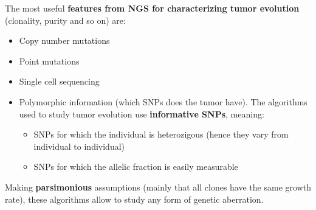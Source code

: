   The most useful \textbf{features from NGS for characterizing tumor evolution}
  (clonality, purity and so on) are:
  \begin{itemize}
    \item Copy number mutations
    \item Point mutations
    \item Single cell sequencing
    \item Polymorphic information (which SNPs does the tumor have). The
    algorithms used to study tumor evolution use \textbf{informative SNPs},
    meaning:
    \begin{itemize}
      \item SNPs for which the individual is heterozigous (hence they vary from
      individual to individual)
      \item SNPs for which the allelic fraction is easily measurable \\
    \end{itemize}
  \end{itemize}

  
  Making \textbf{parsimonious} assumptions (mainly that all clones have the same
  growth rate), these algorithms allow to study any form of genetic aberration.
  \\

